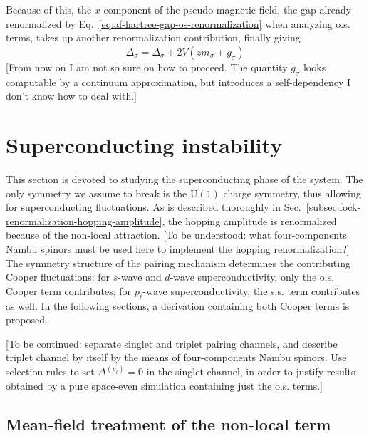 Because of this, the $x$ component of the pseudo-magnetic field, the gap already renormalized by Eq.~\eqref{eq:af-hartree-gap-os-renormalization} when analyzing o.s. terms, takes up another renormalization contribution, finally giving
\[
	\tilde{\Delta}_\sigma = \Delta_\sigma + 2V (zm_\sigma + g_\sigma)
\]
{\color{tabred}[From now on I am not so sure on how to proceed. The quantity $g_\sigma$ looks computable by a continuum approximation, but introduces a self-dependency I don't know how to deal with.]}

\section{Superconducting instability}

This section is devoted to studying the superconducting phase of the system. The only symmetry we assume to break is the $\mathrm{U}(1)$ charge symmetry, thus allowing for superconducting fluctuations. 
{\color{tabred}
	As is described thoroughly in Sec.~\ref{subsec:fock-renormalization-hopping-amplitude}, the hopping amplitude is renormalized because of the non-local attraction. [To be understood: what four-components Nambu spinors must be used here to implement the hopping renormalization?]
}
The symmetry structure of the pairing mechanism determines the contributing Cooper fluctuations: for $s$-wave and $d$-wave superconductivity, only the o.s. Cooper term contributes; for $p_\ell$-wave superconductivity, the s.s. term contributes as well. In the following sections, a derivation containing both Cooper terms is proposed.

{\color{tabred}
	[To be continued: separate singlet and triplet pairing channels, and describe triplet channel by itself by the means of four-components Nambu spinors. Use selection rules to set $\Delta^{(p_\ell)}=0$ in the singlet channel, in order to justify results obtained by a pure space-even simulation containing just the o.s. terms.]
}

\subsection{Mean-field treatment of the non-local term}

